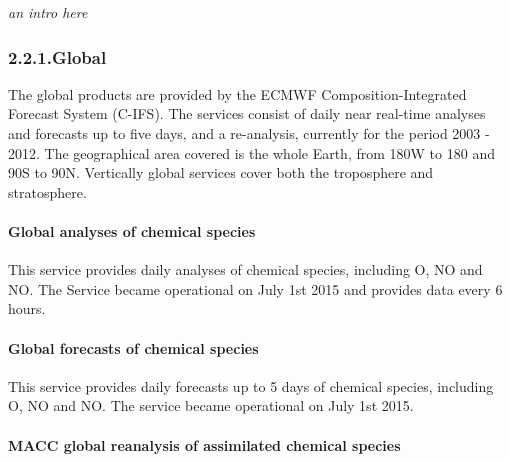 \documentclass[9pt]{report}
\begin{document}
\noindent{}\emph{an intro here}%

\subsubsection{2.2.1.\hspace*{0.5em}Global}\label{sec-global}%

\noindent{}The global products are provided by the ECMWF Composition-Integrated Forecast System (C-IFS).
The services consist of daily near real-time analyses and forecasts up to five days, and a re-analysis, currently for the period 2003 - 2012. 
The geographical area covered is the whole Earth, from 180\textdegree{}W to 180\textdegree{} and 90\textdegree{}S to 90\textdegree{}N. 
Vertically global services cover both the troposphere and stratosphere.%

\paragraph{Global analyses of chemical species}\label{sec-global-analyses-of-chemical-species}%

\noindent{}This service provides daily analyses of chemical species, including O, NO and NO. 
The Service became operational on July 1st 2015 and provides data every 6 hours.%

\paragraph{Global forecasts of chemical species}\label{sec-global-forecasts-of-chemical-species}%

\noindent{}This service provides daily forecasts up to 5 days of chemical species, including O, NO and NO. 
The service became operational on July 1st 2015.%

\paragraph{MACC global reanalysis of assimilated chemical species}\label{sec-macc-global-reanalysis-of-assimilated-chemical-species}%
\end{document}

